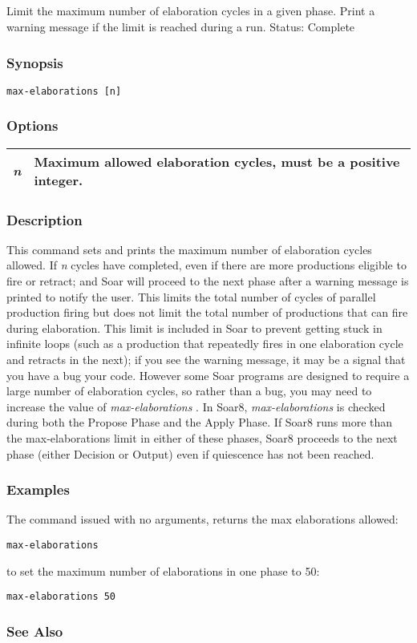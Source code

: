 \subsection{}
\label{max-elaborations}
Limit the maximum number of elaboration cycles in a given phase. Print a warning message if the limit is reached during a run. 
 Status: Complete
\subsubsection*{Synopsis}
\begin{verbatim}
max-elaborations [n]
\end{verbatim}
\subsubsection*{Options}
\begin{tabular}{|l|l|}
\hline 
\emph{n}
 & Maximum allowed elaboration cycles, must be a positive integer.  \\
 \hline 
\end{tabular}
\subsubsection*{Description}
 This command sets and prints the maximum number of elaboration cycles allowed. If \emph{n}
 cycles have completed, even if there are more productions eligible to fire or retract; and Soar will proceed to the next phase after a warning message is printed to notify the user. This limits the total number of cycles of parallel production firing but does not limit the total number of productions that can fire during elaboration. 
 This limit is included in Soar to prevent getting stuck in infinite loops (such as a production that repeatedly fires in one elaboration cycle and retracts in the next); if you see the warning message, it may be a signal that you have a bug your code. However some Soar programs are designed to require a large number of elaboration cycles, so rather than a bug, you may need to increase the value of \emph{max-elaborations}
. 
 In Soar8, \emph{max-elaborations}
 is checked during both the Propose Phase and the Apply Phase. If Soar8 runs more than the max-elaborations limit in either of these phases, Soar8 proceeds to the next phase (either Decision or Output) even if quiescence has not been reached. 
\subsubsection*{Examples}
 The command issued with no arguments, returns the max elaborations allowed: \begin{verbatim}
max-elaborations 
\end{verbatim}
 to set the maximum number of elaborations in one phase to 50: \begin{verbatim}
max-elaborations 50
\end{verbatim}
\subsubsection*{See Also}
